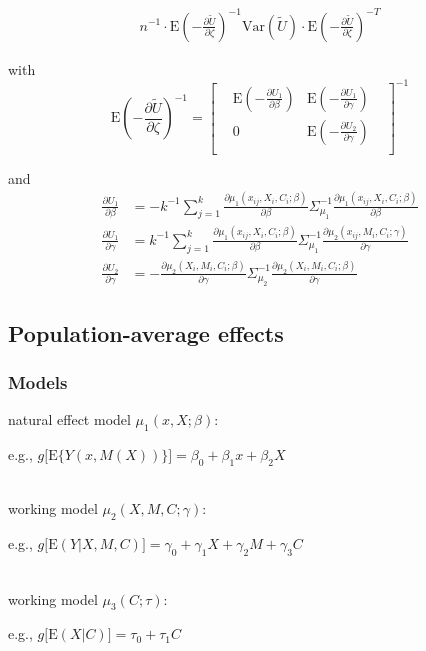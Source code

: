 \documentclass[]{article}
\begin{document}
\begin{eqnarray*}
\displaystyle n^{-1}\cdot\mbox{E}\left(-\frac{\partial \tilde U}{\partial \zeta}\right)^{-1} \mbox{Var}(\tilde U) \cdot \mbox{E}\left(-\frac{\partial \tilde U}{\partial \zeta}\right)^{-T}
\end{eqnarray*}

\noindent with 
\[
\renewcommand\arraystretch{2.5}
\displaystyle \mbox{E}\left(-\frac{\partial \tilde U}{\partial \zeta}\right)^{-1} = 
\begin{bmatrix}
& \displaystyle\mbox{E}\left(-\frac{\partial U_1}{\partial \beta}\right) & \displaystyle\mbox{E}\left(-\frac{\partial U_1}{\partial \gamma}\right) &\\
& 0 & \displaystyle\mbox{E}\left(-\frac{\partial U_2}{\partial \gamma}\right) &\\
\end{bmatrix}^{-1}
\]

\noindent and
\begin{align*}
\displaystyle \frac{\partial U_1}{\partial \beta} &= - k^{-1} \sum_{j=1}^{k} \frac{\partial \mu_1(x_{ij},X_i,C_i;\beta)}{\partial \beta} \Sigma_{\mu_1}^{-1} \frac{\partial \mu_1(x_{ij},X_i,C_i;\beta)}{\partial \beta}\\
\displaystyle \frac{\partial U_1}{\partial \gamma} &= k^{-1} \sum_{j=1}^{k} \frac{\partial \mu_1(x_{ij},X_i,C_i;\beta)}{\partial \beta} \Sigma_{\mu_1}^{-1} \frac{\partial \mu_2(x_{ij}, M_i,C_i;\gamma)}{\partial \gamma}\\
\displaystyle \frac{\partial U_2}{\partial \gamma} &= - \frac{\partial \mu_2(X_i,M_i,C_i;\beta)}{\partial \gamma} \Sigma_{\mu_2}^{-1} \frac{\partial \mu_2(X_i,M_i,C_i;\beta)}{\partial \gamma}
\end{align*}

\vspace{12pt}

\subsection*{Population-average effects}

\subsubsection*{Models}

natural effect model $\mu_1(x,X;\beta)$:
\begin{flushright} e.g., $g\big[\textrm{E}\{Y(x,M(X))\}\big] = \beta_0 + \beta_1 x + \beta_2 X$ \end{flushright}\\[1em]
working model $\mu_2(X,M,C;\gamma)$:
\begin{flushright} e.g., $g\big[\textrm{E}(Y\vert X,M,C)\big] = \gamma_0 + \gamma_1 X + \gamma_2 M + \gamma_3 C$ \end{flushright}\\[1em]
working model $\mu_3(C;\tau)$:
\begin{flushright} e.g., $g\big[\textrm{E}(X\vert C)\big] = \tau_0 + \tau_1 C$ \end{flushright}
\end{document}

